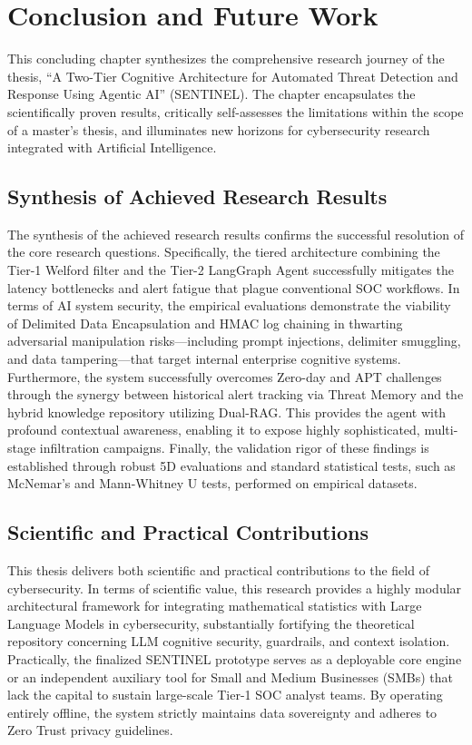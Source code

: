 \chapter{Conclusion and Future Work}
\label{ch:conclusion}

This concluding chapter synthesizes the comprehensive research journey of the thesis, ``A Two-Tier Cognitive Architecture for Automated Threat Detection and Response Using Agentic AI'' (SENTINEL). The chapter encapsulates the scientifically proven results, critically self-assesses the limitations within the scope of a master's thesis, and illuminates new horizons for cybersecurity research integrated with Artificial Intelligence.

\section{Synthesis of Achieved Research Results}
The synthesis of the achieved research results confirms the successful resolution of the core research questions. Specifically, the tiered architecture combining the Tier-1 Welford filter and the Tier-2 LangGraph Agent successfully mitigates the latency bottlenecks and alert fatigue that plague conventional SOC workflows. In terms of AI system security, the empirical evaluations demonstrate the viability of Delimited Data Encapsulation and HMAC log chaining in thwarting adversarial manipulation risks—including prompt injections, delimiter smuggling, and data tampering—that target internal enterprise cognitive systems. Furthermore, the system successfully overcomes Zero-day and APT challenges through the synergy between historical alert tracking via Threat Memory and the hybrid knowledge repository utilizing Dual-RAG. This provides the agent with profound contextual awareness, enabling it to expose highly sophisticated, multi-stage infiltration campaigns. Finally, the validation rigor of these findings is established through robust 5D evaluations and standard statistical tests, such as McNemar's and Mann-Whitney U tests, performed on empirical datasets.

\section{Scientific and Practical Contributions}
This thesis delivers both scientific and practical contributions to the field of cybersecurity. In terms of scientific value, this research provides a highly modular architectural framework for integrating mathematical statistics with Large Language Models in cybersecurity, substantially fortifying the theoretical repository concerning LLM cognitive security, guardrails, and context isolation. Practically, the finalized SENTINEL prototype serves as a deployable core engine or an independent auxiliary tool for Small and Medium Businesses (SMBs) that lack the capital to sustain large-scale Tier-1 SOC analyst teams. By operating entirely offline, the system strictly maintains data sovereignty and adheres to Zero Trust privacy guidelines.

